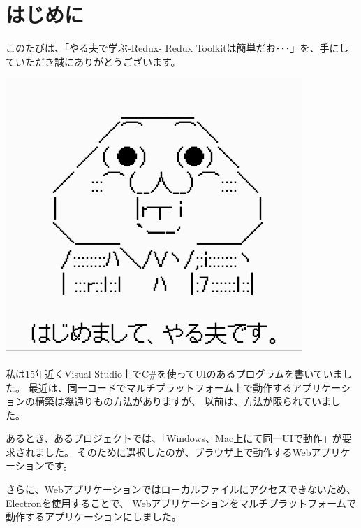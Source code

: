 \chapter{はじめに}
\label{chap:00-preface}

このたびは、「やる夫で学ぶ{-}Redux{-} Redux Toolkitは簡単だお･･･」を、手にしていただき誠にありがとうございます。

\begin{reviewimage}%
\includegraphics[width=1.0\maxwidth]{./images/00-preface/greetings.png}%
\label{image:00-preface:greetings}
\end{reviewimage}
\vspace*{\baselineskip}
\vspace*{\baselineskip}

私は15年近くVisual Studio上でC\#を使ってUIのあるプログラムを書いていました。
最近は、同一コードでマルチプラットフォーム上で動作するアプリケーションの構築は幾通りもの方法がありますが、
以前は、方法が限られていました。

\vspace*{\baselineskip}

あるとき、あるプロジェクトでは、「Windows、Mac上にて同一UIで動作」が要求されました。
そのために選択したのが、ブラウザ上で動作するWebアプリケーションです。

\vspace*{\baselineskip}

さらに、Webアプリケーションではローカルファイルにアクセスできないため、Electronを使用することで、
Webアプリケーションをマルチプラットフォームで動作するアプリケーションにしました。

